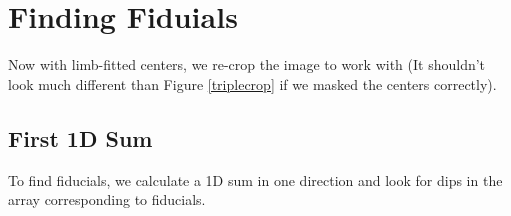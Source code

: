 \documentclass[10pt]{scrartcl}
\begin{document}

\section{Finding Fiduials} %
\label{sec:finding_fiduials}

Now with limb-fitted centers, we re-crop the image to work with (It shouldn't look much different than Figure \ref{triplecrop} if we masked the centers correctly).

\subsection{First 1D Sum} %
\label{sub:first_1d_sum}

To find fiducials, we calculate a 1D sum in one direction and look for dips in the array corresponding to fiducials. 
\end{document}
